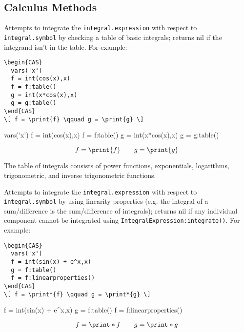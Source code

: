\subsection{Calculus Methods}


Attempts to integrate the \texttt{integral.expression} with respect to \texttt{integral.symbol} by checking a table of basic integrals; returns nil if the integrand isn't in the table. For example:

\begin{codebox}
    \begin{verbatim}
\begin{CAS}
  vars('x')
  f = int(cos(x),x)
  f = f:table()
  g = int(x*cos(x),x)
  g = g:table()
\end{CAS}
\[ f = \print{f} \qquad g = \print{g} \]
\end{verbatim}
\tcblower
\begin{CAS}
  vars('x')
  f = int(cos(x),x)
  f = f:table()
  g = int(x*cos(x),x)
  g = g:table()
  \end{CAS}
\[ f = \print{f} \qquad g = \print{g} \]
\end{codebox}
The table of integrals consists of power functions, exponentials, logarithms, trigonometric, and inverse trigonometric functions.


Attempts to integrate the \texttt{integral.expression} with respect to \texttt{integral.symbol} by using linearity properties (e.g. the integral of a sum/difference is the sum/difference of integrals); returns nil if any individual component cannot be integrated using \texttt{IntegralExpression:integrate()}. For example:

\begin{codebox}
    \begin{verbatim}
\begin{CAS}
  vars('x')
  f = int(sin(x) + e^x,x)
  g = f:table()
  f = f:linearproperties()
\end{CAS}
\[ f = \print*{f} \qquad g = \print*{g} \]
\end{verbatim}
\tcblower
\begin{CAS}
  f = int(sin(x) + e^x,x)
  g = f:table()
  f = f:linearproperties()
\end{CAS}
\[ f = \print*{f} \qquad g = \print*{g} \]
\end{codebox}

